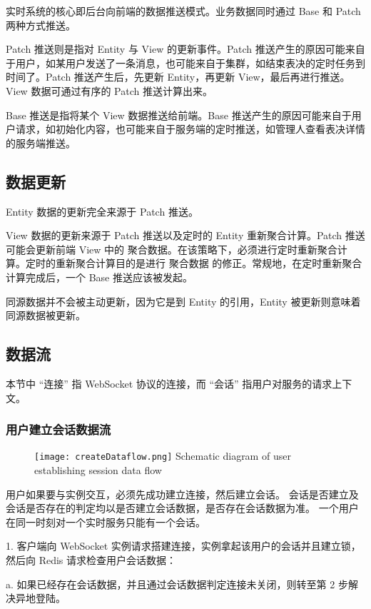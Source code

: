 实时系统的核心即后台向前端的数据推送模式。业务数据同时通过 Base 和 Patch 两种方式推送。

Patch 推送则是指对 Entity 与 View 的更新事件。Patch 推送产生的原因可能来自于用户，如某用户发送了一条消息，也可能来自于集群，如结束表决的定时任务到时间了。Patch 推送产生后，先更新 Entity，再更新 View，最后再进行推送。View 数据可通过有序的 Patch 推送计算出来。

Base 推送是指将某个 View 数据推送给前端。Base 推送产生的原因可能来自于用户请求，如初始化内容，也可能来自于服务端的定时推送，如管理人查看表决详情的服务端推送。

\subsection{数据更新}

Entity 数据的更新完全来源于 Patch 推送。

View 数据的更新来源于 Patch 推送以及定时的 Entity 重新聚合计算。Patch 推送可能会更新前端 View 中的 聚合数据。在该策略下，必须进行定时重新聚合计算。定时的重新聚合计算目的是进行 聚合数据 的修正。常规地，在定时重新聚合计算完成后，一个 Base 推送应该被发起。

同源数据并不会被主动更新，因为它是到 Entity 的引用，Entity 被更新则意味着同源数据被更新。

\subsection{数据流}
本节中 “连接” 指 WebSocket 协议的连接，而 “会话” 指用户对服务的请求上下文。
\subsubsection{用户建立会话数据流}
\begin{figure}[!htp]
  \centering
  \texttt{[image: createDataflow.png]}
    {Schematic diagram of user establishing session data flow}
 \label{fig:createDataflow}
\end{figure}
用户如果要与实例交互，必须先成功建立连接，然后建立会话。
会话是否建立及会话是否存在的判定均以是否建立会话数据，是否存在会话数据为准。
一个用户在同一时刻对一个实时服务只能有一个会话。

1. 客户端向 WebSocket 实例请求搭建连接，实例拿起该用户的会话并且建立锁，然后向 Redis 请求检查用户会话数据：

\quad{}a. 如果已经存在会话数据，并且通过会话数据判定连接未关闭，则转至第 2 步解决异地登陆。

